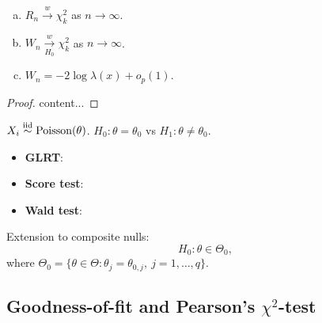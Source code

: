 \begin{prop}
	\begin{enumerate}[a)]
		\item $R_n \xrightarrow{w} \chi^2_k$ as $n\to \infty$.
		
		\item $W_n \xrightarrow[H_0]{w} \chi^2_k$ as $n\to \infty$. 

		\item $W_n = -2 \log \lambda(x) + o_p(1)$.
	\end{enumerate}
\end{prop}
\begin{proof}
	content...
\end{proof}

\begin{exap}
	$X_i \stackrel{\text{iid}}{\sim} \mathrm{Poisson}(\theta)$. $H_0: \theta = \theta_0$ vs $H_1: \theta \neq \theta_0.$ 
	
	\begin{itemize}
		\item \textbf{GLRT}:
		
		\item \textbf{Score test}:
		
		\item \textbf{Wald test}:
	\end{itemize}
\end{exap}

\begin{mydef}
	Extension to composite nulls: 
	$$H_0: \theta \in \Theta_0,$$
	where $\Theta_0 = \{ \theta \in \Theta: \theta_j = \theta_{0,j},\ j=1,\dots,q \}$.
\end{mydef}

\subsection{Goodness-of-fit and Pearson's $\chi^2$-test}